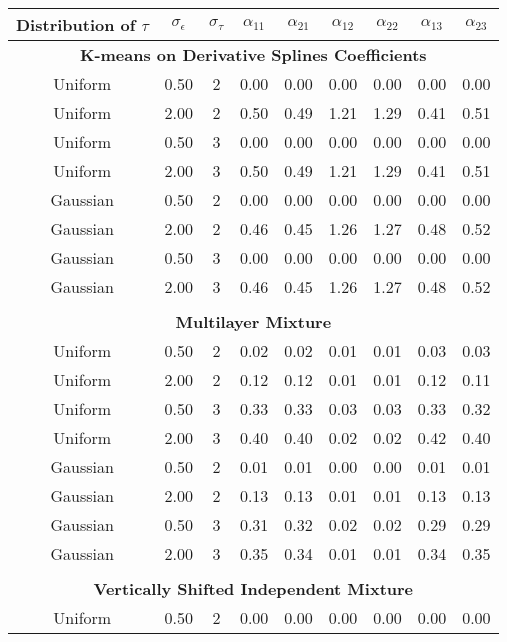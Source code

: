 \begin{table}[ht]
\begin{center}
\begin{tabular}{ccc|cccccc}
  \hline Distribution of $\tau$&$\sigma_{\epsilon}$&$\sigma_{\tau}$&$\alpha_{11}$&$\alpha_{21}$&$\alpha_{12}$&$\alpha_{22}$&$\alpha_{13}$&$\alpha_{23}$\\  \hline\multicolumn{9}{c}{\textbf{K-means on Derivative Splines Coefficients}}\\ Uniform & 0.50 &   2 & 0.00 & 0.00 & 0.00 & 0.00 & 0.00 & 0.00 \\ 
  Uniform & 2.00 &   2 & 0.50 & 0.49 & 1.21 & 1.29 & 0.41 & 0.51 \\ 
  Uniform & 0.50 &   3 & 0.00 & 0.00 & 0.00 & 0.00 & 0.00 & 0.00 \\ 
  Uniform & 2.00 &   3 & 0.50 & 0.49 & 1.21 & 1.29 & 0.41 & 0.51 \\ 
  Gaussian & 0.50 &   2 & 0.00 & 0.00 & 0.00 & 0.00 & 0.00 & 0.00 \\ 
  Gaussian & 2.00 &   2 & 0.46 & 0.45 & 1.26 & 1.27 & 0.48 & 0.52 \\ 
  Gaussian & 0.50 &   3 & 0.00 & 0.00 & 0.00 & 0.00 & 0.00 & 0.00 \\ 
  Gaussian & 2.00 &   3 & 0.46 & 0.45 & 1.26 & 1.27 & 0.48 & 0.52 \\ 
   \\ \multicolumn{9}{c}{\textbf{Multilayer Mixture}}\\Uniform & 0.50 &   2 & 0.02 & 0.02 & 0.01 & 0.01 & 0.03 & 0.03 \\ 
  Uniform & 2.00 &   2 & 0.12 & 0.12 & 0.01 & 0.01 & 0.12 & 0.11 \\ 
  Uniform & 0.50 &   3 & 0.33 & 0.33 & 0.03 & 0.03 & 0.33 & 0.32 \\ 
  Uniform & 2.00 &   3 & 0.40 & 0.40 & 0.02 & 0.02 & 0.42 & 0.40 \\ 
  Gaussian & 0.50 &   2 & 0.01 & 0.01 & 0.00 & 0.00 & 0.01 & 0.01 \\ 
  Gaussian & 2.00 &   2 & 0.13 & 0.13 & 0.01 & 0.01 & 0.13 & 0.13 \\ 
  Gaussian & 0.50 &   3 & 0.31 & 0.32 & 0.02 & 0.02 & 0.29 & 0.29 \\ 
  Gaussian & 2.00 &   3 & 0.35 & 0.34 & 0.01 & 0.01 & 0.34 & 0.35 \\ 
   \\ \multicolumn{9}{c}{\textbf{Vertically Shifted Independent Mixture}}\\Uniform & 0.50 &   2 & 0.00 & 0.00 & 0.00 & 0.00 & 0.00 & 0.00 \\ 

\end{tabular}
\end{center}
\end{table}
